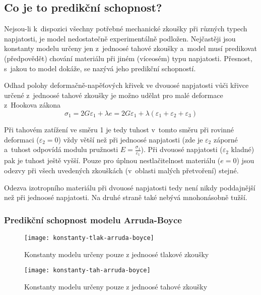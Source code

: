 
\subsection{Co je to predikční schopnost?}
Nejsou-li k~dispozici všechny potřebné mechanické zkoušky při různých typech napjatosti, je model nedostatečně experimentálně podložen.
Nejčastěji jsou konstanty modelu určeny jen z~jednoosé tahové zkoušky a~model musí predikovat (předpovědět) chování materiálu při jiném (víceosém) typu napjatosti. Přesnost, s~jakou to model dokáže, se nazývá jeho predikční schopností.

Odhad polohy deformačně-napěťových křivek ve dvouosé napjatosti vůči křivce určené z~jednoosé tahové zkoušky je možno udělat pro malé deformace z~Hookova zákona
\begin{equation}
	\sigma_1 = 2 G \varepsilon_1 + \lambda e = 2 G \varepsilon_1 + \lambda \left( \varepsilon_1 + \varepsilon_2 + \varepsilon_3 \right)
\end{equation}

Při tahovém zatížení ve směru 1 je tedy tuhost v~tomto směru při rovinné deformaci ($\varepsilon_2 = 0$) vždy větší než při jednoosé napjatosti (zde je $\varepsilon_2$ záporné a~tuhost odpovídá modulu pružnosti $E = \frac{\sigma_1}{\varepsilon_1}$). 
Při dvouosé napjatosti ($\varepsilon_2$ kladné) pak je tuhost ještě vyšší.
Pouze pro úplnou nestlačitelnost materiálu ($e = 0$) jsou odezvy při všech uvedených zkouškách (v~oblasti malých přetvoření) stejné.

Odezva izotropního materiálu při dvouosé napjatosti tedy není nikdy poddajnější než při jednoosé napjatosti.
Na druhé straně také nebývá mnohonásobně tužší.

\subsubsection{Predikční schopnost modelu Arruda-Boyce}
\begin{figure}[H]
	\centering
	\texttt{[image: konstanty-tlak-arruda-boyce]}
	\caption{Konstanty modelu určeny pouze z jednoosé tlakové zkoušky}
	\label{fig:konstanty-tlak-arruda-boyce}
\end{figure}
\begin{figure}[H]
	\centering
	\texttt{[image: konstanty-tah-arruda-boyce]}
	\caption{Konstanty modelu určeny pouze z jednoosé tahové zkoušky}
	\label{fig:konstanty-tah-arruda-boyce}
\end{figure}
